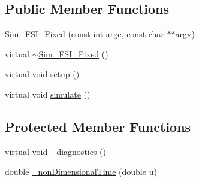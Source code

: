 \subsection*{Public Member Functions}
\begin{DoxyCompactItemize}
\item 
\hyperlink{class_sim___f_s_i___fixed_aafc7f4d24e8753e801d70b9a69b2456c}{Sim\+\_\+\+F\+S\+I\+\_\+\+Fixed} (const int argc, const char $\ast$$\ast$argv)
\item 
virtual \hyperlink{class_sim___f_s_i___fixed_a81c8fc9897fd888e5206b87b987872ff}{$\sim$\+Sim\+\_\+\+F\+S\+I\+\_\+\+Fixed} ()
\item 
virtual void \hyperlink{class_sim___f_s_i___fixed_a9da9f0d775b05a9a9c77003914af307c}{setup} ()
\item 
virtual void \hyperlink{class_sim___f_s_i___fixed_a1e37b29e07ddd05ae1f0c2be321e9bb2}{simulate} ()
\end{DoxyCompactItemize}
\subsection*{Protected Member Functions}
\begin{DoxyCompactItemize}
\item 
virtual void \hyperlink{class_sim___f_s_i___fixed_ac140ab0a939bb401b682fecbf43480a1}{\+\_\+diagnostics} ()
\item 
double \hyperlink{class_sim___f_s_i___fixed_ab432f7aa27b4c3a2fbbf15a955dcd700}{\+\_\+non\+Dimensional\+Time} (double u)
\end{DoxyCompactItemize}
